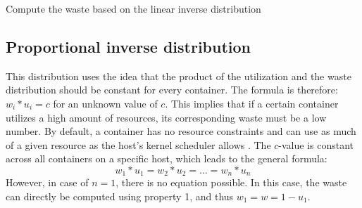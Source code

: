 \begin{algorithm}
    \caption{Compute the waste based on the linear inverse distribution}\label{alg:linear}
\end{algorithm}


\subsection{Proportional inverse distribution} \label{sec:proportional}
This distribution uses the idea that the product of the utilization and the waste distribution should be constant for every container. 
The formula is therefore: $w_i * u_i = c$ for an unknown value of $c$. This implies that if a certain container utilizes a high amount of resources, its corresponding waste must be a low number. By default, a container has no resource constraints and can use as much of a given resource as the host’s kernel scheduler allows \cite{docker:resource}.
The $c$-value is constant across all containers on a specific host, which leads to the general formula: 
\begin{equation} \label{eq:constant}
w_1 * u_1 = w_2 * u_2 = \dots = w_n * u_n
\end{equation}
However, in case of $n = 1$, there is no equation possible. In this case, the waste can directly be computed using property 1, and thus $w_1 = w = 1 - u_1$.\\

